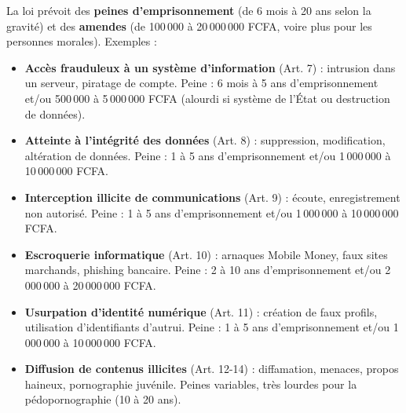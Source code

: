 \documentclass[11pt]{article}
\begin{document}
\begin{exemplebox}
La loi prévoit des \textbf{peines d'emprisonnement} (de 6 mois à 20 ans selon la gravité) et des \textbf{amendes} (de 100\,000 à 20\,000\,000 FCFA, voire plus pour les personnes morales). Exemples :
\begin{itemize}
\item \textbf{Accès frauduleux à un système d'information} (Art. 7) : intrusion dans un serveur, piratage de compte. Peine : 6 mois à 5 ans d'emprisonnement et/ou 500\,000 à 5\,000\,000 FCFA (alourdi si système de l'État ou destruction de données).
\item \textbf{Atteinte à l'intégrité des données} (Art. 8) : suppression, modification, altération de données. Peine : 1 à 5 ans d'emprisonnement et/ou 1\,000\,000 à 10\,000\,000 FCFA.
\item \textbf{Interception illicite de communications} (Art. 9) : écoute, enregistrement non autorisé. Peine : 1 à 5 ans d'emprisonnement et/ou 1\,000\,000 à 10\,000\,000 FCFA.
\item \textbf{Escroquerie informatique} (Art. 10) : arnaques Mobile Money, faux sites marchands, phishing bancaire. Peine : 2 à 10 ans d'emprisonnement et/ou 2\,000\,000 à 20\,000\,000 FCFA.
\item \textbf{Usurpation d'identité numérique} (Art. 11) : création de faux profils, utilisation d'identifiants d'autrui. Peine : 1 à 5 ans d'emprisonnement et/ou 1\,000\,000 à 10\,000\,000 FCFA.
\item \textbf{Diffusion de contenus illicites} (Art. 12-14) : diffamation, menaces, propos haineux, pornographie juvénile. Peines variables, très lourdes pour la pédopornographie (10 à 20 ans).
\end{itemize}
\end{exemplebox}
\end{document}
